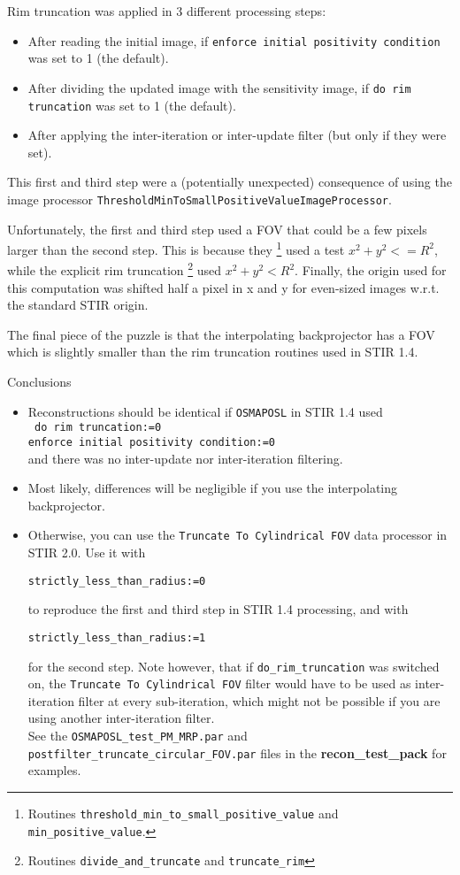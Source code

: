 \documentclass{article}
\begin{document}
Rim truncation was applied in 3 different processing steps:
\begin{itemize}
\item After reading the initial image, if
\texttt{enforce initial positivity condition} was set to 1 (the default).
\item After dividing the updated image with the sensitivity image, if
\texttt{do rim truncation} was set to 1 (the default).
\item After applying the inter-iteration or inter-update filter (but
only if they were set).
\end{itemize}
This first and third step were a (potentially unexpected) consequence of using
the image processor \texttt{ThresholdMinToSmallPositiveValueImageProcessor}. 

Unfortunately, the first and third step used a FOV that could be
a few pixels larger than the second step. This is 
because they
\footnote{Routines \texttt{threshold\_min\_to\_small\_positive\_value}
and \texttt{min\_positive\_value}.}
 used a test $x^2+y^2 <= R^2$, while the explicit rim
truncation
\footnote{Routines \texttt{divide\_and\_truncate} and \texttt{truncate\_rim}}
 used $x^2+y^2 < R^2$.
Finally, the origin used for this computation was shifted half a pixel in 
x and y for even-sized images w.r.t. the standard STIR origin.

The final piece of the puzzle is that the interpolating backprojector has a 
FOV which is slightly smaller than the rim truncation routines used in 
STIR 1.4.

Conclusions
\begin{itemize}
\item Reconstructions should be identical if \texttt{OSMAPOSL} in 
STIR 1.4 used\\
\texttt{
do rim truncation:=0\\
enforce initial positivity condition:=0
}\\
and there was no inter-update nor inter-iteration filtering.

\item Most likely, differences will be negligible if you use the interpolating
backprojector.

\item Otherwise, you can use the \texttt{Truncate To Cylindrical FOV}
data processor in STIR 2.0. Use it with
\begin{verbatim}
strictly_less_than_radius:=0
\end{verbatim}
to reproduce the first and third step in STIR 1.4 processing, and with
\begin{verbatim}
strictly_less_than_radius:=1
\end{verbatim}
for the second step. Note however, that if
\texttt{do\_rim\_truncation} was switched on, the 
\texttt{Truncate To Cylindrical FOV} filter would have to be used
as inter-iteration filter at every sub-iteration, which might not be 
possible if you are using another inter-iteration filter.\\
See the \texttt{OSMAPOSL\_test\_PM\_MRP.par}
and \texttt{postfilter\_truncate\_circular\_FOV.par} files in the 
\textbf{recon\_test\_pack} for examples. 
\end{itemize}
\end{document}
